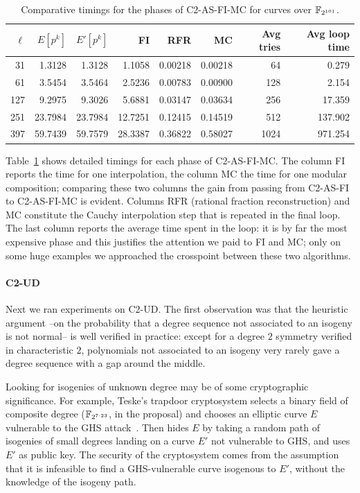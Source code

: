 \begin{table}
  \centering
  \begin{tabular}{r r r r r r r r}
    \hline
    $\ell$ & $E[p^k]$ & $E'[p^k]$ & FI & RFR & MC & Avg tries & Avg loop time\\
    \hline
    31 & 1.3128 & 1.3128 & 1.1058 & 0.00218 & 0.00218 & 64 & 0.279\\
    61 & 3.5454 & 3.5464 & 2.5236 & 0.00783 & 0.00900 & 128 & 2.154 \\
    127 & 9.2975 & 9.3026 & 5.6881 & 0.03147 & 0.03634 & 256 & 17.359 \\
    251	& 23.7984 & 23.7984 & 12.7251 & 0.12415 & 0.14519 & 512 & 137.902 \\
    397 & 59.7439 & 59.7579 & 28.3387 & 0.36822 & 0.58027 & 1024 & 971.254 \\
  \end{tabular}
  \caption{Comparative timings for the phases of C2-AS-FI-MC for curves over $\mathbb{F}_{2^{101}}$.}
  \label{tab:C2}
\end{table}

Table~\ref{tab:C2} shows detailed timings for each phase of
C2-AS-FI-MC. The column FI reports the time for one interpolation, the
column MC the time for one modular composition; comparing these two
columns the gain from passing from C2-AS-FI to C2-AS-FI-MC is
evident. Columns RFR (rational fraction reconstruction) and MC
constitute the Cauchy interpolation step that is repeated in the final
loop. The last column reports the average time spent in the loop: it
is by far the most expensive phase and this justifies the attention we
paid to FI and MC; only on some huge examples we approached the
crosspoint between these two algorithms.


\paragraph{C2-UD}
\label{sec:c2-ud}
Next we ran experiments on C2-UD. The first observation was that the
heuristic argument --on the probability that a degree sequence not
associated to an isogeny is not normal-- is well verified in practice:
except for a degree $2$ symmetry verified in characteristic $2$,
polynomials not associated to an isogeny very rarely gave a degree
sequence with a gap around the middle.

Looking for isogenies of unknown degree may be of some cryptographic
significance. For example, Teske's trapdoor cryptosystem selects a
binary field of composite degree ($\mathbb{F}_{2^{7\cdot 23}}$, in the
proposal) and chooses an elliptic curve $E$ vulnerable to the GHS
attack~\cite{gaudry+hess+smart02}. Then hides $E$ by taking a random
path of isogenies of small degrees landing on a curve $E'$ not
vulnerable to GHS, and uses $E'$ as public key. The security of the
cryptosystem comes from the assumption that it is infeasible to find a
GHS-vulnerable curve isogenous to $E'$, without the knowledge of the
isogeny path. 

